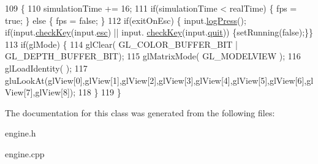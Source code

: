 \begin{DoxyCode}
109                     \{
110   simulationTime += 16;
111   \textcolor{keywordflow}{if}(simulationTime < realTime) \{ fps = \textcolor{keyword}{true}; \} \textcolor{keywordflow}{else} \{ fps = \textcolor{keyword}{false}; \}
112   \textcolor{keywordflow}{if}(exitOnEsc) \{ input.\hyperlink{classInput_a7664a52377e4bda7524d288df481954b}{logPress}(); \textcolor{keywordflow}{if}(input.\hyperlink{classInput_a2f5d21366e04e3ce200fe73c6c748dd8}{checkKey}(input.\hyperlink{classInput_a528c1c27ef18062003acc6ecc6418719}{esc}) || input.
      \hyperlink{classInput_a2f5d21366e04e3ce200fe73c6c748dd8}{checkKey}(input.\hyperlink{classInput_a756c57e33cd0ff991ba76ecff4dfa8a4}{quit})) \{setRunning(\textcolor{keyword}{false});\}\}
113   \textcolor{keywordflow}{if}(glMode) \{
114    glClear( GL\_COLOR\_BUFFER\_BIT | GL\_DEPTH\_BUFFER\_BIT);
115    glMatrixMode( GL\_MODELVIEW );
116    glLoadIdentity( );
117    gluLookAt(glView[0],glView[1],glView[2],glView[3],glView[4],glView[5],glView[6],glView[7],glView[8]);
118   \}
119 \}
\end{DoxyCode}


The documentation for this class was generated from the following files\+:\begin{DoxyCompactItemize}
\item 
engine.\+h\item 
engine.\+cpp\end{DoxyCompactItemize}
